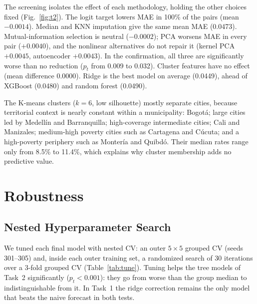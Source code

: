 \documentclass[conference]{IEEEtran}
\begin{document}
The screening isolates the effect of each methodology, holding the other choices fixed (Fig.~\ref{fig:t2}). The logit target lowers MAE in 100\% of the pairs (mean $-0.0014$). Median and KNN imputation give the same mean MAE (0.0473). Mutual-information selection is neutral ($-0.0002$); PCA worsens MAE in every pair ($+0.0040$), and the nonlinear alternatives do not repair it (kernel PCA $+0.0045$, autoencoder $+0.0043$). In the confirmation, all three are significantly worse than no reduction ($p_t$ from 0.009 to 0.032). Cluster features have no effect (mean difference 0.0000). Ridge is the best model on average (0.0449), ahead of XGBoost (0.0480) and random forest (0.0490).

The K-means clusters ($k=6$, low silhouette) mostly separate cities, because territorial context is nearly constant within a municipality: Bogot\'a; large cities led by Medell\'in and Barranquilla; high-coverage intermediate cities; Cali and Manizales; medium-high poverty cities such as Cartagena and C\'ucuta; and a high-poverty periphery such as Monter\'ia and Quibd\'o. Their median rates range only from 8.5\% to 11.4\%, which explains why cluster membership adds no predictive value.

\section{Robustness}\label{sec:robust}

\subsection{Nested Hyperparameter Search}
We tuned each final model with nested CV: an outer $5\times5$ grouped CV (seeds 301--305) and, inside each outer training set, a randomized search of 30 iterations over a 3-fold grouped CV (Table~\ref{tab:tune}). Tuning helps the tree models of Task~2 significantly ($p_t<0.001$): they go from worse than the group median to indistinguishable from it. In Task~1 the ridge correction remains the only model that beats the naive forecast in both tests.
\end{document}
